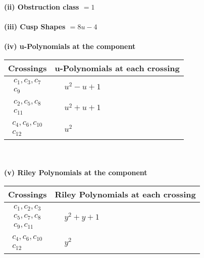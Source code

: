 \documentclass[1p]{elsarticle_modified}
\theoremstyle{definition}
\begin{document}
\flushleft \textbf{(ii) Obstruction class $= 1$}\\~\\
\flushleft \textbf{(iii) Cusp Shapes $= 8 u-4$}\\~\\
\newpage\renewcommand{\arraystretch}{1}
\flushleft \textbf{(iv) u-Polynomials at the component}\newline \\
\begin{tabular}{m{50pt}|m{274pt}}
Crossings & \hspace{64pt}u-Polynomials at each crossing \\
\hline $$\begin{aligned}c_{1},c_{3},c_{7}\\c_{9}\end{aligned}$$&$\begin{aligned}
&u^2- u+1
\end{aligned}$\\
\hline $$\begin{aligned}c_{2},c_{5},c_{8}\\c_{11}\end{aligned}$$&$\begin{aligned}
&u^2+u+1
\end{aligned}$\\
\hline $$\begin{aligned}c_{4},c_{6},c_{10}\\c_{12}\end{aligned}$$&$\begin{aligned}
&u^2
\end{aligned}$\\
\hline
\end{tabular}\\~\\
\newpage\renewcommand{\arraystretch}{1}
\flushleft \textbf{(v) Riley Polynomials at the component}\newline \\
\begin{tabular}{m{50pt}|m{274pt}}
Crossings & \hspace{64pt}Riley Polynomials at each crossing \\
\hline $$\begin{aligned}c_{1},c_{2},c_{3}\\c_{5},c_{7},c_{8}\\c_{9},c_{11}\end{aligned}$$&$\begin{aligned}
&y^2+y+1
\end{aligned}$\\
\hline $$\begin{aligned}c_{4},c_{6},c_{10}\\c_{12}\end{aligned}$$&$\begin{aligned}
&y^2
\end{aligned}$\\
\hline
\end{tabular}\\~\\
\end{document}
